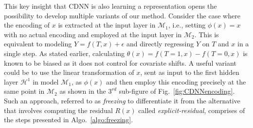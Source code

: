 \documentclass[sigconf]{acmart}
\theoremstyle{plain}
\numberwithin{equation}{section}
\begin{document}
This key insight that CDNN is also learning a representation opens the possibility to develop multiple variants of our method. Consider the case where the encoding of $x$ is extracted at the input layer in $\mathcal{M}_1$, i.e., setting $\phi(x)=x$ with no actual encoding and employed at the input layer in $\mathcal{M}_2$. This is equivalent to modeling $Y = f(T,x) + \epsilon$ and directly regressing $Y$ on $T$ and $x$ in a single step. As stated earlier, calculating $\theta(x) = f(T=1,x) - f(T=0,x)$ is known to be biased as it does not control for covariate shifts. A useful variant could be to use the linear transformation of $x$, sent as input to the first hidden layer $\mathcal{H}^1$ in model $\mathcal{M}_1$, as $\phi(x)$ and then employ this encoding precisely at the same point in $\mathcal{M}_2$ as shown in the $3^{rd}$ sub-figure of Fig.~\ref{fig:CDNNencoding}. Such an approach, referred to as \emph{freezing} to differentiate it from the alternative that involves computing the residual $R(x)$ called \emph{explicit-residual}, comprises of the steps presented in Algo.~\ref{algo:freezing}.
\end{document}
